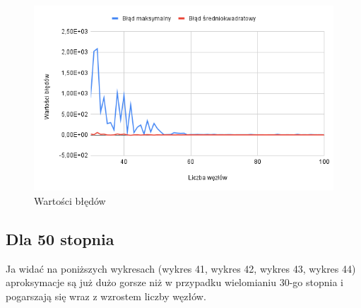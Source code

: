 \documentclass{article}
\begin{document}
\begin{figure}[H]
  \centering
  \begin{minipage}[b]{0.4\textwidth}
    \includegraphics[width=\textwidth]{img42.png}
    \caption{Wartości błędów}
  \end{minipage}
\end{figure}

\subsection{Dla 50 stopnia}

Ja widać na poniższych wykresach (wykres 41, wykres 42, wykres 43, wykres 44) aproksymacje są już dużo gorsze niż w przypadku wielomianiu 30-go stopnia i pogarszają się wraz z wzrostem liczby węzłów.
\end{document}

